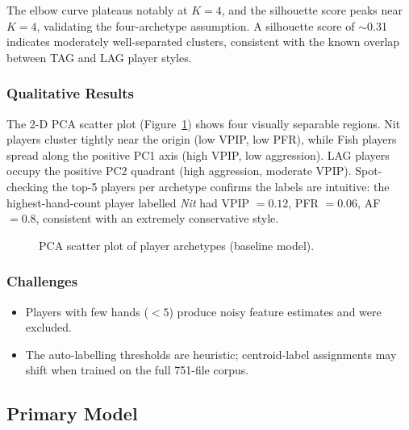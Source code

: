 \documentclass{article}
\begin{document}
The elbow curve plateaus notably at $K=4$, and the silhouette score peaks near $K=4$,
validating the four-archetype assumption. A silhouette score of $\sim$0.31 indicates
moderately well-separated clusters, consistent with the known overlap between TAG and
LAG player styles.

\subsubsection{Qualitative Results}
The 2-D PCA scatter plot (Figure~\ref{fig:scatter_placeholder}) shows four visually
separable regions. Nit players cluster tightly near the origin (low VPIP, low PFR),
while Fish players spread along the positive PC1 axis (high VPIP, low aggression).
LAG players occupy the positive PC2 quadrant (high aggression, moderate VPIP).
Spot-checking the top-5 players per archetype confirms the labels are intuitive: the
highest-hand-count player labelled \textit{Nit} had VPIP $= 0.12$, PFR $= 0.06$,
AF $= 0.8$, consistent with an extremely conservative style.

\begin{figure}[H]
\centering
{}
\caption{PCA scatter plot of player archetypes (baseline model).}
\label{fig:scatter_placeholder}
\end{figure}

\subsubsection{Challenges}
\begin{itemize}[noitemsep]
  \item Players with few hands ($< 5$) produce noisy feature estimates and were excluded.
  \item The auto-labelling thresholds are heuristic; centroid-label assignments may shift
        when trained on the full 751-file corpus.
\end{itemize}

\subsection{Primary Model}
\end{document}
